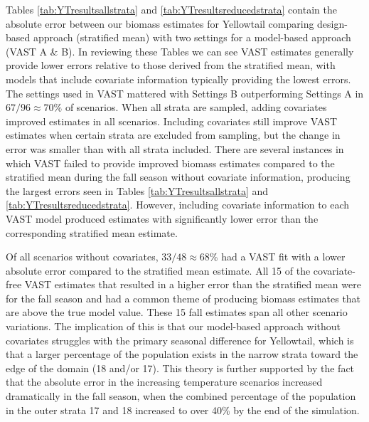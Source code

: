 \documentclass[
  12pt,
]{article}
\begin{document}
Tables \ref{tab:YTresultsallstrata} and \ref{tab:YTresultsreducedstrata} contain the absolute error between our biomass estimates for Yellowtail comparing design-based approach (stratified mean) with two settings for a model-based approach (VAST A \& B). In reviewing these Tables we can see VAST estimates generally provide lower errors relative to those derived from the stratified mean, with models that include covariate information typically providing the lowest errors. The settings used in VAST mattered with Settings B outperforming Settings A in \(67/96\approx 70\%\) of scenarios. When all strata are sampled, adding covariates improved estimates in all scenarios. Including covariates still improve VAST estimates when certain strata are excluded from sampling, but the change in error was smaller than with all strata included. There are several instances in which VAST failed to provide improved biomass estimates compared to the stratified mean during the fall season without covariate information, producing the largest errors seen in Tables \ref{tab:YTresultsallstrata} and \ref{tab:YTresultsreducedstrata}. However, including covariate information to each VAST model produced estimates with significantly lower error than the corresponding stratified mean estimate.

Of all scenarios without covariates, \(33/48\approx68\)\% had a VAST fit with a lower absolute error compared to the stratified mean estimate. All 15 of the covariate-free VAST estimates that resulted in a higher error than the stratified mean were for the fall season and had a common theme of producing biomass estimates that are above the true model value. These 15 fall estimates span all other scenario variations. The implication of this is that our model-based approach without covariates struggles with the primary seasonal difference for Yellowtail, which is that a larger percentage of the population exists in the narrow strata toward the edge of the domain (18 and/or 17). This theory is further supported by the fact that the absolute error in the increasing temperature scenarios increased dramatically in the fall season, when the combined percentage of the population in the outer strata 17 and 18 increased to over 40\% by the end of the simulation.
\end{document}
